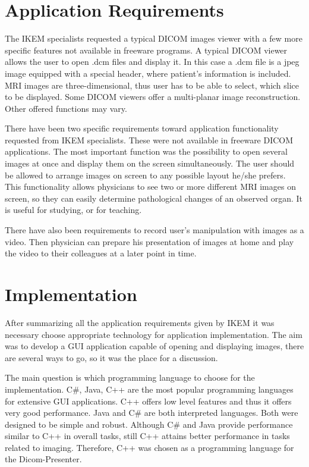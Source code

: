 \section{Application Requirements}
\label{requirements}
The IKEM specialists requested a typical DICOM images viewer with a few more specific features not available in freeware programs. A typical DICOM viewer allows the user to open .dcm files and display it. In this case a .dcm file is a jpeg image equipped with a special header, where patient's information is included. MRI images are three-dimensional, thus user has to be able to select, which slice to be displayed. Some DICOM viewers offer a multi-planar image reconstruction. Other offered functions may vary.

There have been two specific requirements toward application functionality requested from IKEM specialists. These were not available in freeware DICOM applications. The most important function was the possibility to open several images at once and display them on the screen simultaneously. The user should be allowed to arrange images on screen to any possible layout he/she prefers. This functionality allows physicians to see two or more different MRI images on screen, so they can easily determine pathological changes of an observed organ. It is useful for studying, or for teaching.

There have also been requirements to record user's manipulation with images as a video. Then physician can prepare his presentation of images at home and play the video to their colleagues at a later point in time.

\section{Implementation}
After summarizing all the application requirements given by IKEM it was necessary choose appropriate technology for application implementation. The aim was to develop a GUI application capable of opening and displaying images, there are several ways to go, so it was the place for a discussion. 

The main question is which programming language to choose for the implementation. C\#, Java, C++ are the most popular programming languages for extensive GUI applications. C++ offers low level features and thus it offers very good performance. Java and C\# are both interpreted languages. Both were designed to be simple and robust. Although C\# and Java provide performance similar to C++ in overall tasks, still C++ attains better performance in tasks related to imaging\cite[Chapter~14]{csharpjavaperformance}. Therefore, C++ was chosen as a programming language for the Dicom-Presenter.


